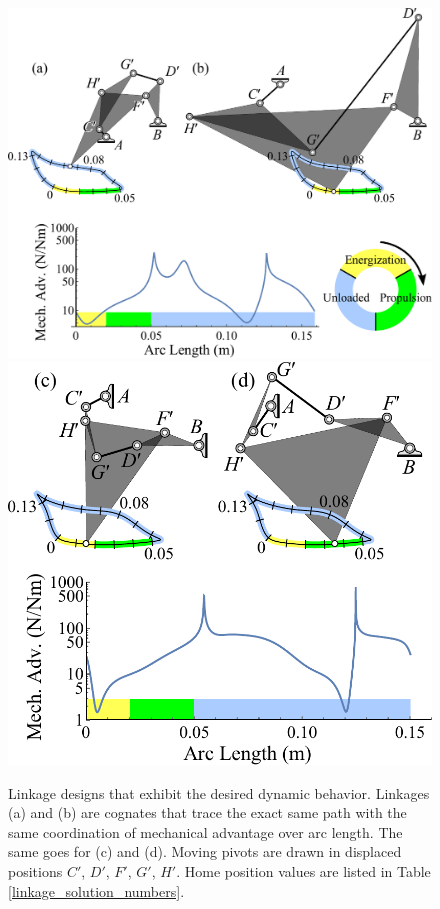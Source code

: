 \documentclass[journal]{IEEEtran}
\begin{document}
\begin{figure}[t]
\centering
\includegraphics[scale=0.4]{synth_results_first}
\hfil
\vspace{5mm}
\includegraphics[scale=0.4]{synth_results_second}
\caption{Linkage designs that exhibit the desired dynamic behavior.  Linkages (a) and (b) are cognates that trace the exact same path with the same coordination of mechanical advantage over arc length.  The same goes for (c) and (d).   Moving pivots are drawn in displaced positions $C'$, $D'$, $F'$, $G'$, $H'$.  Home position values are listed in Table \ref{linkage_solution_numbers}.}
\label{synth_results}
\end{figure}
\end{document}
